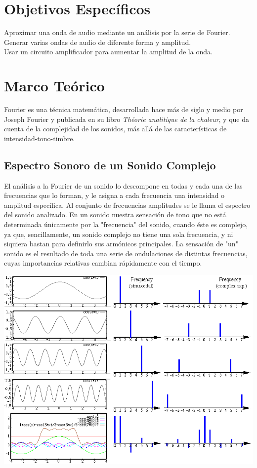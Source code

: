 \documentclass[10pt,a4paper]{book}
\begin{document}
\section{Objetivos Específicos}

Aproximar una onda de audio mediante un análisis por la serie de Fourier.\\
Generar varias ondas de audio de diferente forma y amplitud.\\
Usar un circuito amplificador para aumentar la amplitud de la onda.\\

\section{Marco Teórico}

Fourier  es una técnica matemática, desarrollada hace más de siglo y medio por Joseph Fourier y publicada en su libro \textit{Théorie analitique de la chaleur}, y que da cuenta de la complejidad de los sonidos, más allá de las características de intensidad-tono-timbre.\\
\subsection{Espectro Sonoro de un Sonido Complejo}

El análisis a la Fourier de un sonido lo descompone en todas y cada una de las frecuencias que lo forman, y le asigna a cada frecuencia una intensidad o amplitud específica. Al conjunto de frecuencias amplitudes se le llama el espectro del sonido analizado.
En un sonido nuestra sensación de tono que no está determinada únicamente por la "frecuencia" del sonido, cuando éste es complejo, ya que, sencillamente, un sonido complejo no tiene una sola frecuencia, y ni siquiera bastan para definirlo sus armónicos principales. La sensación de "un" sonido es el resultado de toda una serie de ondulaciones de distintas frecuencias, cuyas importancias relativas cambian rápidamente con el tiempo.\\

\begin{center}
	\includegraphics[scale=0.45]{AudioFourier.png}\\
\end{center}
\end{document}
